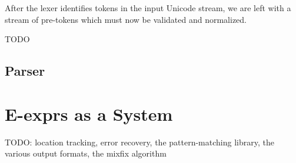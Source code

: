 \documentclass[11pt]{article} %
\begin{document}
After the lexer identifies tokens in the input Unicode stream, we are left with a stream of pre-tokens which must now be validated and normalized.

TODO

\subsection{Parser}

\section{E-exprs as a System}

TODO: location tracking, error recovery, the pattern-matching library, the various output formats, the mixfix algorithm
\end{document}
